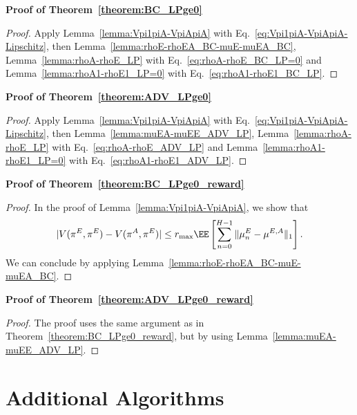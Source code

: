 \documentclass{article}
\theoremstyle{plain}
\begin{document}
\noindent\textbf{Proof of Theorem~\ref{theorem:BC_LPge0}}

\begin{proof}
    Apply Lemma~\ref{lemma:Vpi1piA-VpiApiA} with Eq.~\eqref{eq:Vpi1piA-VpiApiA-Lipschitz}, then Lemma~\ref{lemma:rhoE-rhoEA_BC-muE-muEA_BC}, Lemma~\ref{lemma:rhoA-rhoE_LP} with Eq.~\eqref{eq:rhoA-rhoE_BC_LP=0} and Lemma~\ref{lemma:rhoA1-rhoE1_LP=0} with Eq.~\eqref{eq:rhoA1-rhoE1_BC_LP}.
\end{proof}

\noindent\textbf{Proof of Theorem~\ref{theorem:ADV_LPge0}}

\begin{proof}
    Apply Lemma~\ref{lemma:Vpi1piA-VpiApiA} with Eq.~\eqref{eq:Vpi1piA-VpiApiA-Lipschitz}, then Lemma~\ref{lemma:muEA-muEE_ADV_LP}, Lemma~\ref{lemma:rhoA-rhoE_LP} with Eq.~\eqref{eq:rhoA-rhoE_ADV_LP} and Lemma~\ref{lemma:rhoA1-rhoE1_LP=0} with Eq.~\eqref{eq:rhoA1-rhoE1_ADV_LP}.
\end{proof}

\noindent\textbf{Proof of Theorem~\ref{theorem:BC_LPge0_reward}}

\begin{proof}
    In the proof of Lemma~\ref{lemma:Vpi1piA-VpiApiA}, we show that 
    $$
    \vert V(\pi^E, \pi^E) - V(\pi^A, \pi^E) \vert \leq r_{\max}\EE\left[ \sum_{n=0}^{H-1} \| \mu^E_n - \mu^{E, A} \|_1 \right].
    $$
    We can conclude by applying Lemma~\ref{lemma:rhoE-rhoEA_BC-muE-muEA_BC}.
\end{proof}

\noindent\textbf{Proof of Theorem~\ref{theorem:ADV_LPge0_reward}}

\begin{proof}
    The proof uses the same argument as in  Theorem~\ref{theorem:BC_LPge0_reward}, but by using Lemma~\ref{lemma:muEA-muEE_ADV_LP}.
\end{proof}



\clearpage

\section{Additional Algorithms}
\label{appendix:algo}
\end{document}
